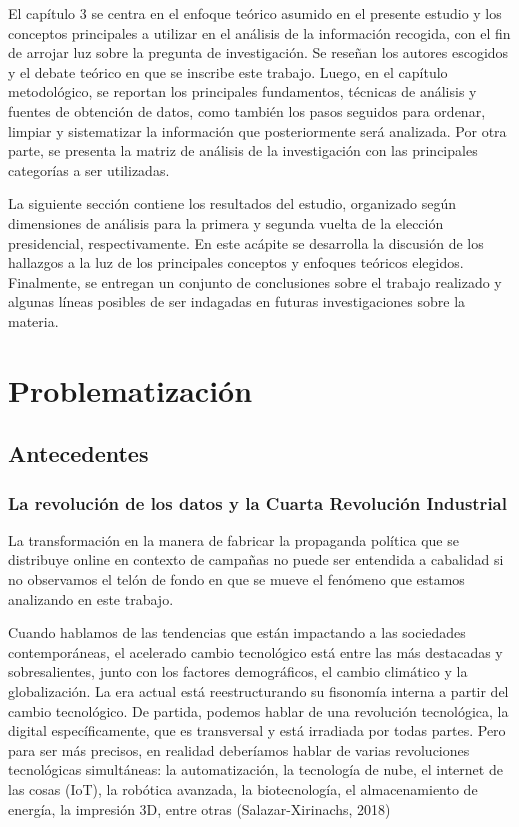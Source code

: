 \documentclass[
  10pt,
  letterpaper,
]{report}
\begin{document}
El capítulo 3 se centra en el enfoque teórico asumido en el presente
estudio y los conceptos principales a utilizar en el análisis de la
información recogida, con el fin de arrojar luz sobre la pregunta de
investigación. Se reseñan los autores escogidos y el debate teórico en
que se inscribe este trabajo. Luego, en el capítulo metodológico, se
reportan los principales fundamentos, técnicas de análisis y fuentes de
obtención de datos, como también los pasos seguidos para ordenar,
limpiar y sistematizar la información que posteriormente será analizada.
Por otra parte, se presenta la matriz de análisis de la investigación
con las principales categorías a ser utilizadas.

La siguiente sección contiene los resultados del estudio, organizado
según dimensiones de análisis para la primera y segunda vuelta de la
elección presidencial, respectivamente. En este acápite se desarrolla la
discusión de los hallazgos a la luz de los principales conceptos y
enfoques teóricos elegidos. Finalmente, se entregan un conjunto de
conclusiones sobre el trabajo realizado y algunas líneas posibles de ser
indagadas en futuras investigaciones sobre la materia.

\newpage

\hypertarget{problematizaciuxf3n}{%
\chapter{Problematización}\label{problematizaciuxf3n}}

\hypertarget{antecedentes}{%
\section{Antecedentes}\label{antecedentes}}

\hypertarget{la-revoluciuxf3n-de-los-datos-y-la-cuarta-revoluciuxf3n-industrial}{%
\subsection{La revolución de los datos y la Cuarta Revolución
Industrial}\label{la-revoluciuxf3n-de-los-datos-y-la-cuarta-revoluciuxf3n-industrial}}

La transformación en la manera de fabricar la propaganda política que se
distribuye online en contexto de campañas no puede ser entendida a
cabalidad si no observamos el telón de fondo en que se mueve el fenómeno
que estamos analizando en este trabajo.

Cuando hablamos de las tendencias que están impactando a las sociedades
contemporáneas, el acelerado cambio tecnológico está entre las más
destacadas y sobresalientes, junto con los factores demográficos, el
cambio climático y la globalización. La era actual está reestructurando
su fisonomía interna a partir del cambio tecnológico. De partida,
podemos hablar de una revolución tecnológica, la digital
específicamente, que es transversal y está irradiada por todas partes.
Pero para ser más precisos, en realidad deberíamos hablar de varias
revoluciones tecnológicas simultáneas: la automatización, la tecnología
de nube, el internet de las cosas (IoT), la robótica avanzada, la
biotecnología, el almacenamiento de energía, la impresión 3D, entre
otras (Salazar-Xirinachs, 2018)
\end{document}
